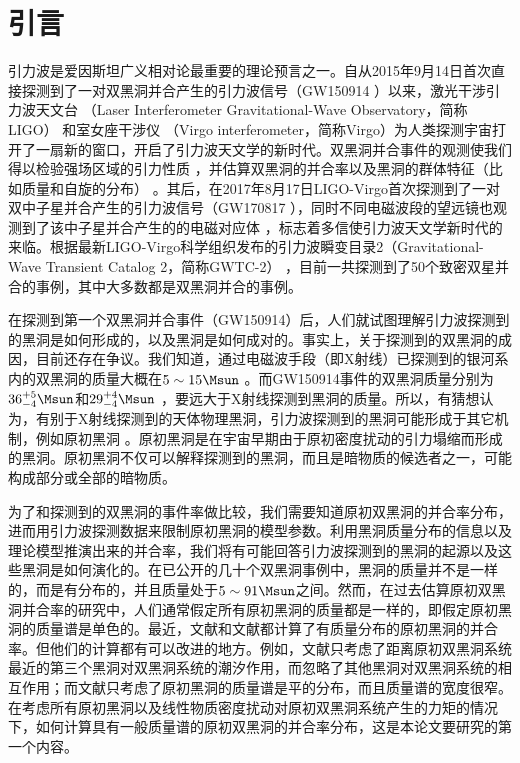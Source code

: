 \chapter{引言}\label{chap:introduction}

引力波是爱因斯坦广义相对论最重要的理论预言之一。自从2015年9月14日首次直接探测到了一对双黑洞并合产生的引力波信号（GW150914 \cite{Abbott:2016blz}）以来，激光干涉引力波天文台 \cite{TheLIGOScientific:2014jea}（Laser Interferometer Gravitational-Wave Observatory，简称LIGO） 和室女座干涉仪 \cite{TheVirgo:2014hva}（Virgo interferometer，简称Virgo）为人类探测宇宙打开了一扇新的窗口，开启了引力波天文学的新时代。双黑洞并合事件的观测使我们得以检验强场区域的引力性质 \cite{TheLIGOScientific:2016src,LIGOScientific:2019fpa}，并估算双黑洞的并合率以及黑洞的群体特征（比如质量和自旋的分布） \cite{LIGOScientific:2018jsj,Abbott:2020gyp}。其后，在2017年8月17日LIGO-Virgo首次探测到了一对双中子星并合产生的引力波信号（GW170817 \cite{TheLIGOScientific:2017qsa}），同时不同电磁波段的望远镜也观测到了该中子星并合产生的的电磁对应体 \cite{Monitor:2017mdv,GBM:2017lvd}，标志着多信使引力波天文学新时代的来临。根据最新LIGO-Virgo科学组织发布的引力波瞬变目录2（Gravitational-Wave Transient Catalog 2，简称GWTC-2） \cite{Abbott:2020niy}，目前一共探测到了50个致密双星并合的事例，其中大多数都是双黑洞并合的事例。

在\lvc 探测到第一个双黑洞并合事件（GW150914\cite{Abbott:2016blz}）后，人们就试图理解引力波探测到的黑洞是如何形成的，以及黑洞是如何成对的。事实上，关于\lvc 探测到的双黑洞的成因，目前还存在争议。我们知道，通过电磁波手段（即X射线）已探测到的银河系内的双黑洞的质量大概在$5\sim 15\Msun$ \cite{Remillard:2006fc}。而GW150914事件的双黑洞质量分别为$36^{+5}_{-4}\Msun$和$29^{+4}_{-4}\Msun$ \cite{Abbott:2016blz}，要远大于X射线探测到黑洞的质量。所以，有猜想认为，有别于X射线探测到的天体物理黑洞，引力波探测到的黑洞可能形成于其它机制，例如原初黑洞 \cite{Bird:2016dcv,Sasaki:2016jop,Chen:2018czv,Clesse:2017bsw}。原初黑洞是在宇宙早期由于原初密度扰动的引力塌缩而形成的黑洞\cite{Hawking:1971ei,Carr:1974nx,Khlopov:2008qy,Sasaki:2018dmp}。原初黑洞不仅可以解释\lvc 探测到的黑洞，而且是暗物质的候选者之一，可能构成部分或全部的暗物质。


为了和\lvc 探测到的双黑洞的事件率做比较，我们需要知道原初双黑洞的并合率分布，进而用引力波探测数据来限制原初黑洞的模型参数。利用黑洞质量分布的信息以及理论模型推演出来的并合率，我们将有可能回答引力波探测到的黑洞的起源以及这些黑洞是如何演化的。在\lvc 已公开的几十个双黑洞事例中，黑洞的质量并不是一样的，而是有分布的，并且质量处于$5\sim 91\Msun$之间\cite{Abbott:2020niy}。然而，在过去估算原初双黑洞并合率的研究中，人们通常假定所有原初黑洞的质量都是一样的，即假定原初黑洞的质量谱是单色的\cite{Sasaki:2016jop,Nakamura:1997sm,Ali-Haimoud:2017rtz,Bird:2016dcv,Nishikawa:2017chy}。最近，文献\cite{Raidal:2017mfl}和文献\cite{Kocsis:2017yty}都计算了有质量分布的原初黑洞的并合率。但他们的计算都有可以改进的地方。例如，文献\cite{Raidal:2017mfl}只考虑了距离原初双黑洞系统最近的第三个黑洞对双黑洞系统的潮汐作用，而忽略了其他黑洞对双黑洞系统的相互作用；而文献\cite{Kocsis:2017yty}只考虑了原初黑洞的质量谱是平的分布，而且质量谱的宽度很窄。在考虑所有原初黑洞以及线性物质密度扰动对原初双黑洞系统产生的力矩的情况下，如何计算具有一般质量谱的原初双黑洞的并合率分布，这是本论文要研究的第一个内容。

